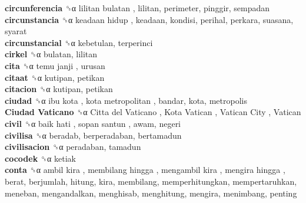 \textbf{circunferencia} ␝α   lilitan bulatan , lilitan, perimeter, pinggir, sempadan  \\
\textbf{circunstancia} ␝α   keadaan hidup , keadaan, kondisi, perihal, perkara, suasana, syarat  \\
\textbf{circunstancial} ␝α  kebetulan, terperinci  \\
\textbf{cirkel} ␝α  bulatan, lilitan  \\
\textbf{cita} ␝α   temu janji , urusan  \\
\textbf{citaat} ␝α  kutipan, petikan  \\
\textbf{citacion} ␝α  kutipan, petikan  \\
\textbf{ciudad} ␝α   ibu kota ,  kota metropolitan , bandar, kota, metropolis  \\
\textbf{Ciudad Vaticano} ␝α   Citta del Vaticano ,  Kota Vatican ,  Vatican City ,  Vatican   \\
\textbf{civil} ␝α   baik hati ,  sopan santun , awam, negeri  \\
\textbf{civilisa} ␝α  beradab, berperadaban, bertamadun  \\
\textbf{civilisacion} ␝α  peradaban, tamadun  \\
\textbf{cocodek} ␝α  ketiak  \\
\textbf{conta} ␝α   ambil kira ,  membilang hingga ,  mengambil kira ,  mengira hingga , berat, berjumlah, hitung, kira, membilang, memperhitungkan, mempertaruhkan, meneban, mengandalkan, menghisab, menghitung, mengira, menimbang, penting  \\
